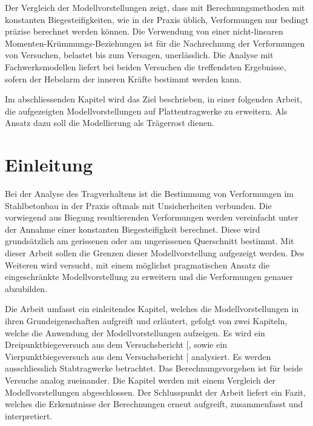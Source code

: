 \documentclass[
  12pt,
  letterpaper,
  egregdoesnotlikesansseriftitles]{scrreprt}
\renewcommand*\contentsname{Inhaltsverzeichnis}
\newcommand\contentsname{Inhaltsverzeichnis}
\begin{document}
Der Vergleich der Modellvorstellungen zeigt, dass mit Berechnungsmethoden mit konstanten Biegesteifigkeiten, wie in der Praxis üblich, Verformungen nur bedingt präzise berechnet werden können. Die Verwendung von einer nicht-linearen Momenten-Krümmungs-Beziehungen ist für die Nachrechnung der Verformungen von Versuchen, belastet bis zum Versagen, unerlässlich. Die Analyse mit Fachwerksmodellen liefert bei beiden Versuchen die treffendsten Ergebnisse, sofern der Hebelarm der inneren Kräfte bestimmt werden kann. 


Im abschliessenden Kapitel wird das Ziel beschrieben, in einer folgenden Arbeit, die aufgezeigten Modellvorstellungen auf Plattentragwerke zu erweitern. Als Ansatz dazu soll die Modellierung als Trägerrost dienen.

\renewcommand*\contentsname{Inhaltsverzeichnis}
{
\hypersetup{linkcolor=}
\setcounter{tocdepth}{1}
\tableofcontents
}
\listoffigures
\listoftables
{}

\chapter{Einleitung}\label{einleitung}

Bei der Analyse des Tragverhaltens ist die Bestimmung von Verformungen
im Stahlbetonbau in der Praxis oftmals mit Unsicherheiten verbunden. Die
vorwiegend aus Biegung resultierenden Verformungen werden vereinfacht
unter der Annahme einer konstanten Biegesteifigkeit berechnet. Diese
wird grundsätzlich am gerissenen oder am ungerissenen Querschnitt
bestimmt. Mit dieser Arbeit sollen die Grenzen dieser Modellvorstellung
aufgezeigt werden. Des Weiteren wird versucht, mit einem möglichst
pragmatischen Ansatz die eingeschränkte Modellvorstellung zu erweitern
und die Verformungen genauer abzubilden.

Die Arbeit umfasst ein einleitendes Kapitel, welches die
Modellvorstellungen in ihren Grundeigenschaften aufgreift und erläutert,
gefolgt von zwei Kapiteln, welche die Anwendung der Modellvorstellungen
aufzeigen. Es wird ein Dreipunktbiegeversuch aus dem Versuchsbericht
{[}\citeproc{ref-Jaeger2006}{1}{]}, sowie ein Vierpunktbiegeversuch aus
dem Versuchsbericht {[}\citeproc{ref-Tue2019}{2}{]} analysiert. Es
werden ausschliesslich Stabtragwerke betrachtet. Das Berechnungsvorgehen
ist für beide Versuche analog zueinander. Die Kapitel werden mit einem
Vergleich der Modellvorstellungen abgeschlossen. Der Schlusspunkt der
Arbeit liefert ein Fazit, welches die Erkenntnisse der Berechnungen
erneut aufgreift, zusammenfasst und interpretiert.
\end{document}
